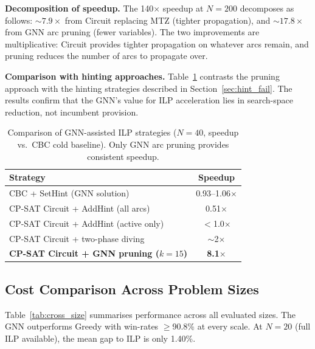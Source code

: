 \documentclass[conference]{IEEEtran}
\begin{document}
\textbf{Decomposition of speedup.} The 140$\times$ speedup at $N{=}200$ decomposes as follows: ${\sim}7.9\times$ from Circuit replacing MTZ (tighter propagation), and ${\sim}17.8\times$ from GNN arc pruning (fewer variables). The two improvements are multiplicative: Circuit provides tighter propagation on whatever arcs remain, and pruning reduces the number of arcs to propagate over.

\textbf{Comparison with hinting approaches.} Table~\ref{tab:hint_comparison} contrasts the pruning approach with the hinting strategies described in Section~\ref{sec:hint_fail}. The results confirm that the GNN's value for ILP acceleration lies in search-space reduction, not incumbent provision.

\begin{table}[htbp]
\caption{Comparison of GNN-assisted ILP strategies ($N{=}40$, speedup vs.\ CBC cold baseline). Only GNN arc pruning provides consistent speedup.}
\label{tab:hint_comparison}
\centering
\begin{tabular}{@{}lc@{}}
\toprule
\textbf{Strategy} & \textbf{Speedup} \\
\midrule
CBC + SetHint (GNN solution) & 0.93--1.06$\times$ \\
CP-SAT Circuit + AddHint (all arcs) & 0.51$\times$ \\
CP-SAT Circuit + AddHint (active only) & $<$1.0$\times$ \\
CP-SAT Circuit + two-phase diving & $\sim$2$\times$ \\
\textbf{CP-SAT Circuit + GNN pruning ($k{=}15$)} & \textbf{8.1$\times$} \\
\bottomrule
\end{tabular}
\end{table}

\subsection{Cost Comparison Across Problem Sizes}

Table~\ref{tab:cross_size} summarises performance across all evaluated sizes. The GNN outperforms Greedy with win-rates $\geq$90.8\% at every scale. At $N{=}20$ (full ILP available), the mean gap to ILP is only 1.40\%.
\end{document}
